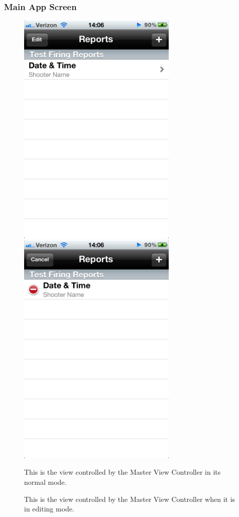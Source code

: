 \subsubsection{Main App Screen}
\begin{figure}[H!htb]
\includegraphics[width=3in]{ScreenShots111011/MainPage.png}
\includegraphics[width=3in]{ScreenShots111011/MainPageEdit.png}
\begin{minipage}{0.5\linewidth}
\caption{This is the view controlled by the Master View Controller in its normal mode.}
\end{minipage}
\begin{minipage}{0.5\linewidth}
\caption{This is the view controlled by the Master View Controller when it is in editing mode.}
\end{minipage}
\end{figure}

